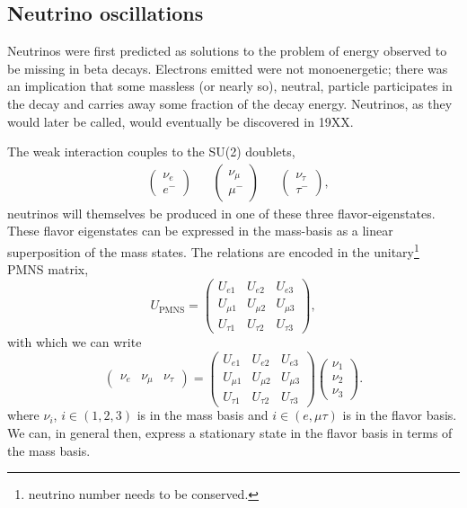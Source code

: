 \documentclass[main.tex]{subfiles}
\begin{document}
\subsection{Neutrino oscillations}

Neutrinos were first predicted as solutions to the problem of energy observed to be missing in beta decays.
Electrons emitted were not monoenergetic; there was an implication that some massless (or nearly so), neutral, particle participates in the decay and carries away some fraction of the decay energy. 
Neutrinos, as they would later be called, would eventually be discovered in 19XX.  

The weak interaction couples to the SU(2) doublets,
\begin{align}
&\left(\begin{array}{c} \nu_{e} \\ e^{-} \end{array}\right) & &\left(\begin{array}{c} \nu_{\mu} \\ \mu^{-} \end{array}\right) & &\left(\begin{array}{c} \nu_{\tau} \\ \tau^{-} \end{array}\right),
\end{align}
neutrinos will themselves be produced in one of these three flavor-eigenstates.
These flavor eigenstates can be expressed in the mass-basis as a linear superposition of the mass states. 
The relations are encoded in the unitary\footnote{neutrino number needs to be conserved.} PMNS matrix, 
\begin{equation}
    U_{\text{PMNS}} = \left(\begin{array}{ccc} U_{e1} & U_{e2} & U_{e3} \\ U_{\mu 1} & U_{\mu 2} & U_{\mu 3} \\ U_{\tau 1} & U_{\tau 2} & U_{\tau 3} \end{array}\right),
\end{equation}
with which we can write
\begin{equation}
    \left(\begin{array}{ccc} \nu_{e} & \nu_{\mu} & \nu_{\tau} \end{array}\right)  = \left(\begin{array}{ccc} U_{e1} & U_{e2} & U_{e3} \\ U_{\mu 1} & U_{\mu 2} & U_{\mu 3} \\ U_{\tau 1} & U_{\tau 2} & U_{\tau 3} \end{array}\right) \left(\begin{array}{c} \nu_{1} \\ \nu_{2} \\ \nu_{3} \end{array}\right).
\end{equation}
where $\nu_{i}$, $i\in\left(1,2,3\right)$ is in the mass basis and $i\in\left(e,\mu\tau\right)$ is in the flavor basis. 
We can, in general then, express a stationary state in the flavor basis in terms of the mass basis. 
\end{document}
